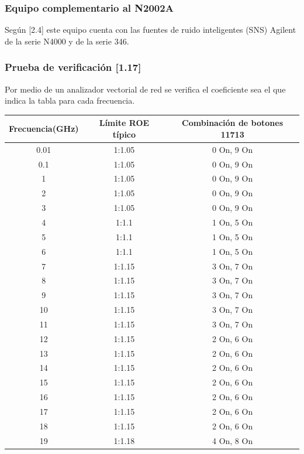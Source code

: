 \subsubsection{Equipo complementario al N2002A}
Según [2.4] este equipo cuenta con las fuentes de ruido inteligentes (SNS) Agilent de la serie N4000 y de la serie 346.

\subsubsection{Prueba de verificación [1.17]}
Por medio de un analizador vectorial de red se verifica el coeficiente sea el que indica la tabla para cada frecuencia.

\begin{table} 
	\begin{tabular}{ccc}
		\toprule
		\textbf{Frecuencia(\si{\giga\hertz})} & \textbf{Límite ROE \newline típico} & \textbf{Combinación \newline de botones 11713} \\
		\midrule
		0.01 	&	1:1.05	&	0 On, 9 On \\
		0.1 	&	1:1.05	&	0 On, 9 On \\
		1	 	&	1:1.05	&	0 On, 9 On \\
		2 		&	1:1.05	&	0 On, 9 On \\
		3 		&	1:1.05	&	0 On, 9 On \\
		4 		&	1:1.1	&	1 On, 5 On \\
		5 		&	1:1.1	&	1 On, 5 On \\
		6	  	&	1:1.1	&	1 On, 5 On \\
		7	 	&	1:1.15	&	3 On, 7 On \\
		8	 	&	1:1.15	&	3 On, 7 On \\
		9	 	&	1:1.15	&	3 On, 7 On \\
		10	 	&	1:1.15	&	3 On, 7 On \\
		11	 	&	1:1.15	&	3 On, 7 On \\
		12	 	&	1:1.15	&	2 On, 6 On \\
		13	 	&	1:1.15	&	2 On, 6 On \\
		14	 	&	1:1.15	&	2 On, 6 On \\
		15	 	&	1:1.15	&	2 On, 6 On \\
		16	 	&	1:1.15	&	2 On, 6 On \\
		17	 	&	1:1.15	&	2 On, 6 On \\																																				
		18	 	&	1:1.15	&	2 On, 6 On \\
		19	 	&	1:1.18	&	4 On, 8 On \\

\end{tabular}
\end{table}
